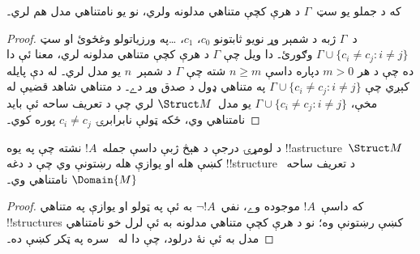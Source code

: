 \documentclass[../../../include/open-logic-section]{subfiles}
\begin{document}

\begin{thm}
 که د جملو يو سټ~$\Gamma$ د هرې کچې متناهي
مدلونه ولري، نو يو نامتناهي مدل هم لري۔
\end{thm}

\begin{proof}
د~$\Gamma$ ژبه د شمېر وړ نويو ثابتونو $c_0$، $c_1$، \dots په
ورزياتولو وغځوئ او سټ $\Gamma \cup \{c_i \neq c_j : i \neq j\}$
وګورئ۔ دا ويل چې $\Gamma$ د هرې کچې متناهي مدلونه لري، معنا ئې دا ده
چې د هر $m >0$ دپاره داسې $n\ge m$ شته چې $\Gamma$ د شمېر~$n$ يو مدل
لري۔ له دې پايله کېږي چې $\Gamma \cup \{c_i \neq c_j : i \neq j\}$
په متناهي ډول د صدق وړ دے۔ د متناهي شاهد قضيې له مخې، $\Gamma \cup
\{c_i \neq c_j : i \neq j\}$ يو مدل~$\Struct M$ لري چې د تعريف ساحه
ئې بايد نامتناهي وي، ځکه ټولې نابرابرۍ $c_i \neq c_j$ پوره کوي۔
\end{proof}

\begin{prop}
د لومړۍ درجې د هېڅ ژبې داسې جمله~$!A$ نشته چې په يوه
!!a{structure}~$\Struct M$ کښې هله او يوازې هله رښتونې وي چې د دغه
!!{structure} د تعريف ساحه~$\Domain{M}$ نامتناهي وي۔
\end{prop}

\begin{proof}
که داسې~$!A$ موجوده وے، نفي~$\lnot !A$ به ئې په ټولو او يوازې په
متناهي !!{structure}s کښې رښتونې وه؛ نو د هرې کچې متناهي مدلونه به
ئې لرل خو نامتناهي مدل به ئې نۀ درلود، چې دا له~
سره په ټکر کښې ده۔
\end{proof}
\end{document}
